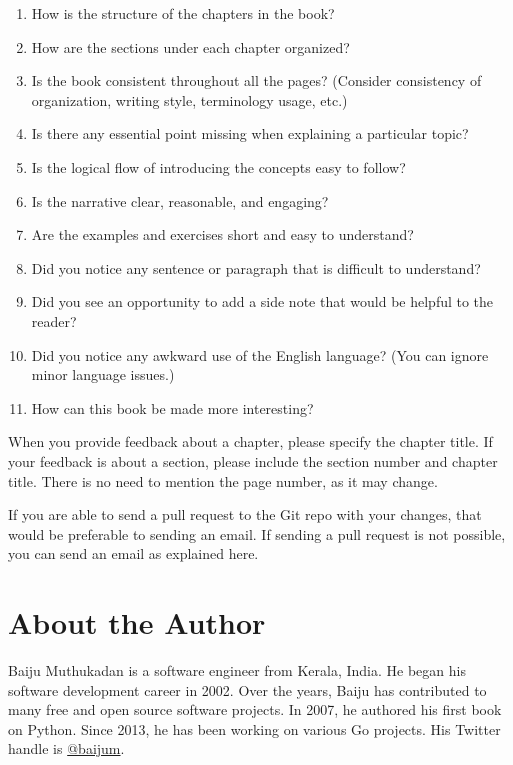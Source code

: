 \begin{enumerate}

\item How is the structure of the chapters in the book?
\item How are the sections under each chapter organized?
\item Is the book consistent throughout all the pages? (Consider consistency of organization, writing style, terminology usage, etc.)
\item Is there any essential point missing when explaining a particular topic?
\item Is the logical flow of introducing the concepts easy to follow?
\item Is the narrative clear, reasonable, and engaging?
\item Are the examples and exercises short and easy to understand?
\item Did you notice any sentence or paragraph that is difficult to understand?
\item Did you see an opportunity to add a side note that would be helpful to the reader?
\item Did you notice any awkward use of the English language? (You can ignore minor language issues.)
\item How can this book be made more interesting?

\end{enumerate}

When you provide feedback about a chapter, please specify the chapter title. If
your feedback is about a section, please include the section number and chapter
title. There is no need to mention the page number, as it may change.

If you are able to send a pull request to the Git repo with your changes, that
would be preferable to sending an email. If sending a pull request is not
possible, you can send an email as explained here.\\[40mm]


\thispagestyle{empty} %

\section*{About the Author}

Baiju Muthukadan is a software engineer from Kerala, India. He began his
software development career in 2002. Over the years, Baiju has contributed to
many free and open source software projects. In 2007, he authored his first book
on Python. Since 2013, he has been working on various Go projects. His Twitter
handle is \href{https://twitter.com/baijum}{@baijum}.
